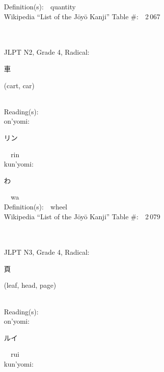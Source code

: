 \begin{multicols}{2}
Definition(s):\ \ quantity \\
Wikipedia ``List of the J\=oy\=o Kanji'' Table \#:\ \ 2\,067 \\
\ \ \\
{\fontsize{34pt}{40pt}  }\ \ \\  %
{JLPT N2, Grade 4, Radical:\ \ {\begin{CJK}{UTF8}{min} 車 \end{CJK}} (cart, car) } \\
Reading(s):\ \ \\
{\hspace*{1em}}on'yomi:\ \ \\
{\hspace*{2em}}{\begin{CJK}{UTF8}{min} リン \end{CJK}}\ \ rin\ \ \\
{\hspace*{1em}}kun'yomi:\ \ \\
{\hspace*{2em}}{\begin{CJK}{UTF8}{min} わ \end{CJK}}\ \ wa\ \ \\
Definition(s):\ \ wheel \\
Wikipedia ``List of the J\=oy\=o Kanji'' Table \#:\ \ 2\,079 \\
\ \ \\
{\fontsize{34pt}{40pt}  }\ \ \\  %
{JLPT N3, Grade 4, Radical:\ \ {\begin{CJK}{UTF8}{min} 頁 \end{CJK}} (leaf, head, page) } \\
Reading(s):\ \ \\
{\hspace*{1em}}on'yomi:\ \ \\
{\hspace*{2em}}{\begin{CJK}{UTF8}{min} ルイ \end{CJK}}\ \ rui\ \ \\
{\hspace*{1em}}kun'yomi:\ \ \\

\end{multicols}
